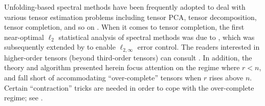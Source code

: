 Unfolding-based spectral methods  have been frequently adopted to deal with various tensor estimation problems including tensor PCA, tensor decomposition, tensor completion,
and so on \citep{richard2014a,montanari2016spectral,han2020an,zhang2018tensor,cai2019subspace,cai2019tensorOR,xia2019on,xia2017statistically,moitra2019spectral,liu2020tensor,zhang2020islet,xia2020inference,tong2021scaling}.
When it comes to tensor completion, the first near-optimal $\ell_2$ statistical analysis of spectral methods was due to \citet{montanari2016spectral},
which was subsequently extended by \citet{cai2019subspace} to enable $\ell_{2,\infty}$ error control.
The readers interested in higher-order tensors (beyond third-order tensors) can consult \citet{montanari2016spectral,richard2014a}.
In addition, the theory and algorithm presented herein focus attention on the regime where $r< n$, and fall short of accommodating ``over-complete'' tensors when $r$ rises above $n$. Certain ``contraction'' tricks are needed in order to cope with the over-complete regime; see \citet{hopkins2016fast,montanari2016spectral}.





